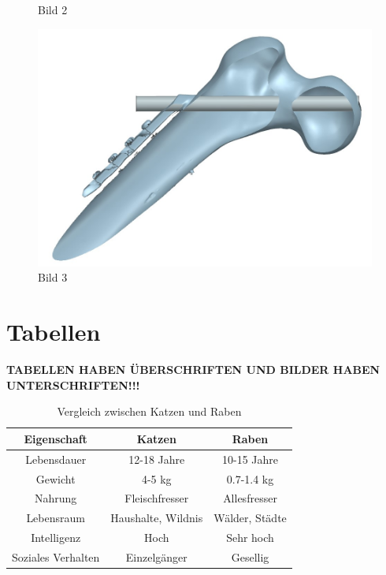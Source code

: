 \begin{figure}[H]
\begin{minipage}[b]{0.3\textwidth}
        \caption{Bild 2}
    \end{minipage}
    \hfill
    \begin{minipage}[b]{0.3\textwidth}
        \centering
        \includegraphics[width=\textwidth]{abb1/bohrschablone_Seitenansicht.jpg}
        \caption{Bild 3}
    \end{minipage}
\end{figure}



\section{Tabellen}

\textbf{TABELLEN HABEN ÜBERSCHRIFTEN UND BILDER HABEN UNTERSCHRIFTEN!!!}

\begin{table}[H]
    \centering
    \caption{Vergleich zwischen Katzen und Raben}
    \begin{tabular}{|c|c|c|}
        \hline
        \textbf{Eigenschaft} & \textbf{Katzen} & \textbf{Raben} \\
        \hline
        Lebensdauer & 12-18 Jahre & 10-15 Jahre \\
        \hline
        Gewicht & 4-5 kg & 0.7-1.4 kg \\
        \hline
        Nahrung & Fleischfresser & Allesfresser \\
        \hline
        Lebensraum & Haushalte, Wildnis & Wälder, Städte \\
        \hline
        Intelligenz & Hoch & Sehr hoch \\
        \hline
        Soziales Verhalten & Einzelgänger & Gesellig \\
        \hline
    \end{tabular}
    \label{tab:katzen_raben}
\end{table}


